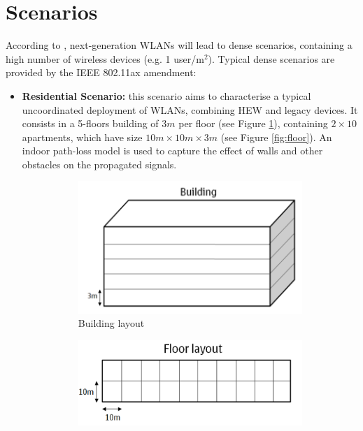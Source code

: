 \documentclass[12pt, a4paper,twoside]{tesi_upf}
\begin{document}
		\section{Scenarios}
		\label{section:scenarios}	
		According to \cite{bellalta2016ieee}, next-generation WLANs will lead to dense scenarios, containing a high number of wireless devices (e.g. 1 user/m$^2$). Typical dense scenarios are provided by the IEEE 802.11ax amendment:
		\begin{itemize}			
			\item \textbf{Residential Scenario:} this scenario aims to characterise a typical uncoordinated deployment of WLANs, combining HEW and legacy devices. It consists in a 5-floors building of $3 m$ per floor (see Figure \ref{fig:building}), containing $2 \times 10$ apartments, which have size $10 m \times 10 m \times 3 m$ (see Figure \ref{fig:floor}). An indoor path-loss model is used to capture the effect of walls and other obstacles on the propagated signals. 
			\begin{figure}[h!]
				\centering
				\begin{subfigure}[b]{0.4\textwidth}
					\includegraphics[width=\textwidth]{images/residential_ax_1}
					\caption{Building layout}
					\label{fig:building}
				\end{subfigure}
				\begin{subfigure}[b]{0.4\textwidth}
					\includegraphics[width=\textwidth]{images/residential_ax_2}

\end{subfigure}
\end{figure}
\end{itemize}
\end{document}
